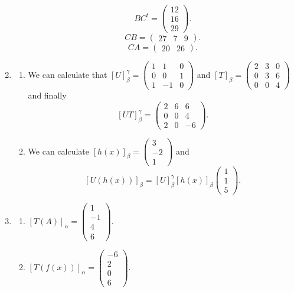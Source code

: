 \begin{enumerate}
\begin{enumerate}
\[BC^t=\left(\begin{array}{c}12\\16\\29\end{array}\right).\]
\[CB=\left(\begin{array}{ccc}27&7&9\end{array}\right).\]
\[CA=\left(\begin{array}{ccc}20&26\end{array}\right).\]
\end{enumerate}
\item \begin{enumerate}
\item We can calculate that $[U]_{\beta}^{\gamma}=\left(\begin{array}{ccc}1&1&0\\0&0&1\\1&-1&0\end{array}\right)$ and $[T]_{\beta}=\left(\begin{array}{ccc}2&3&0\\0&3&6\\0&0&4\end{array}\right)$ and finally \[[UT]_{\beta}^{\gamma}=\left(\begin{array}{ccc}2&6&6\\0&0&4\\2&0&-6\end{array}\right).\]
\item We can calculate $[h(x)]_{\beta}=\left(\begin{array}{c}3\\-2\\1\end{array}\right)$ and \[[U(h(x))]_{\beta}=[U]_{\beta}^{\gamma}[h(x)]_{\beta}\left(\begin{array}{c}1\\1\\5\end{array}\right).\]
\end{enumerate}
\item \begin{enumerate}
\item $[T(A)]_{\alpha}=\left(\begin{array}{c}1\\-1\\4\\6\end{array}\right).$
\item $[T(f(x))]_{\alpha}=\left(\begin{array}{c}-6\\2\\0\\6\end{array}\right).$

\end{enumerate}
\end{enumerate}

